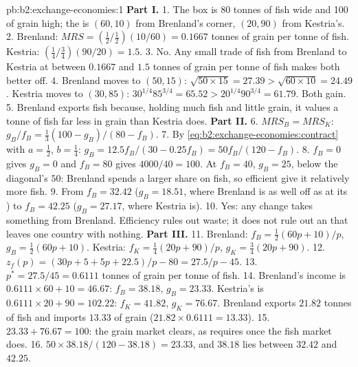 \begin{solution}{pb:b2:exchange-economies:1}
\textbf{Part I.}
1. The box is 80 tonnes of fish wide and 100 of grain high; the  is $(60, 10)$ from Brenland's
corner, $(20, 90)$ from Kestria's.
2. Brenland: $\mathit{MRS} = (\tfrac12/\tfrac12)(10/60) = 0.1667$ tonnes of grain per tonne of fish.
Kestria: $(\tfrac14/\tfrac34)(90/20) = 1.5$.
3. No. Any small trade of fish from Brenland to Kestria at between $0.1667$ and $1.5$ tonnes of grain per
tonne of fish makes both better off.
4. Brenland moves to $(50, 15)$: $\sqrt{50 \times 15} = 27.39 > \sqrt{60 \times 10} = 24.49$. Kestria
moves to $(30, 85)$: $30^{1/4}85^{3/4} = 65.52 > 20^{1/4}90^{3/4} = 61.79$. Both gain.
5. Brenland exports fish because, holding much fish and little grain, it values a tonne of fish far less
in grain than Kestria does.
\textbf{Part II.}
6. $\mathit{MRS}_B = \mathit{MRS}_K$: $g_B/f_B = \tfrac13(100 - g_B)/(80 - f_B)$.
7. By \eqref{eq:b2:exchange-economies:contract} with $a = \tfrac12$, $b = \tfrac14$: $g_B = 12.5f_B/(30 -
0.25f_B) = 50f_B/(120 - f_B)$.
8. $f_B = 0$ gives $g_B = 0$ and $f_B = 80$ gives $4000/40 = 100$. At $f_B = 40$, $g_B = 25$, below the
diagonal's $50$: Brenland spends a larger share on fish, so efficient  give it relatively
more fish.
9. From $f_B = 32.42$ ($g_B = 18.51$, where Brenland is as well off as at its ) to $f_B = 42.25$
($g_B = 27.17$, where Kestria is).
10. Yes: any change takes something from Brenland. Efficiency rules out waste; it does not rule out an
 that leaves one country with nothing.
\textbf{Part III.}
11. Brenland: $f_B = \tfrac12(60p + 10)/p$, $g_B = \tfrac12(60p + 10)$. Kestria: $f_K = \tfrac14(20p +
90)/p$, $g_K = \tfrac34(20p + 90)$.
12. $z_f(p) = (30p + 5 + 5p + 22.5)/p - 80 = 27.5/p - 45$.
13. $p^* = 27.5/45 = 0.6111$ tonnes of grain per tonne of fish.
14. Brenland's income is $0.6111 \times 60 + 10 = 46.67$: $f_B = 38.18$, $g_B = 23.33$. Kestria's is
$0.6111 \times 20 + 90 = 102.22$: $f_K = 41.82$, $g_K = 76.67$. Brenland exports $21.82$ tonnes of fish
and imports $13.33$ of grain ($21.82 \times 0.6111 = 13.33$).
15. $23.33 + 76.67 = 100$: the grain market clears, as  requires once the fish market does.
16. $50 \times 38.18/(120 - 38.18) = 23.33$, and $38.18$ lies between $32.42$ and $42.25$.

\end{solution}
